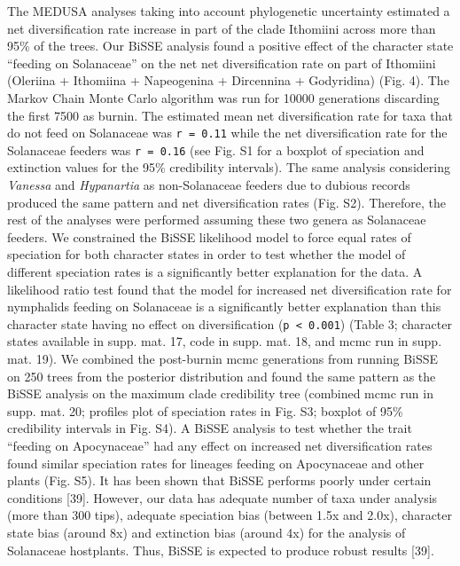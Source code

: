 \documentclass[10pt]{article}
\begin{document}
The MEDUSA analyses taking into account phylogenetic uncertainty
estimated a net diversification rate increase in part of the clade
Ithomiini across more than 95\% of the trees. Our BiSSE analysis found a
positive effect of the character state ``feeding on Solanaceae'' on the
net net diversification rate on part of Ithomiini (Oleriina + Ithomiina
+ Napeogenina + Dircennina + Godyridina) (Fig. 4). The Markov Chain
Monte Carlo algorithm was run for 10000 generations discarding the first
7500 as burnin. The estimated mean net diversification rate for taxa
that do not feed on Solanaceae was \texttt{r = 0.11} while the net
diversification rate for the Solanaceae feeders was \texttt{r = 0.16}
(see Fig. S1 for a boxplot of speciation and extinction values for the
95\% credibility intervals). The same analysis considering
\emph{Vanessa} and \emph{Hypanartia} as non-Solanaceae feeders due to
dubious records produced the same pattern and net diversification rates
(Fig. S2). Therefore, the rest of the analyses were performed assuming
these two genera as Solanaceae feeders. We constrained the BiSSE
likelihood model to force equal rates of speciation for both character
states in order to test whether the model of different speciation rates
is a significantly better explanation for the data. A likelihood ratio
test found that the model for increased net diversification rate for
nymphalids feeding on Solanaceae is a significantly better explanation
than this character state having no effect on diversification
(\texttt{p \textless{} 0.001}) (Table 3; character states available in
supp. mat. 17, code in supp. mat. 18, and mcmc run in supp. mat. 19). We
combined the post-burnin mcmc generations from running BiSSE on 250
trees from the posterior distribution and found the same pattern as the
BiSSE analysis on the maximum clade credibility tree (combined mcmc run
in supp. mat. 20; profiles plot of speciation rates in Fig. S3; boxplot
of 95\% credibility intervals in Fig. S4). A BiSSE analysis to test
whether the trait ``feeding on Apocynaceae'' had any effect on increased
net diversification rates found similar speciation rates for lineages
feeding on Apocynaceae and other plants (Fig. S5). It has been shown
that BiSSE performs poorly under certain conditions {[}39{]}. However,
our data has adequate number of taxa under analysis (more than 300
tips), adequate speciation bias (between 1.5x and 2.0x), character state
bias (around 8x) and extinction bias (around 4x) for the analysis of
Solanaceae hostplants. Thus, BiSSE is expected to produce robust results
{[}39{]}.
\end{document}
